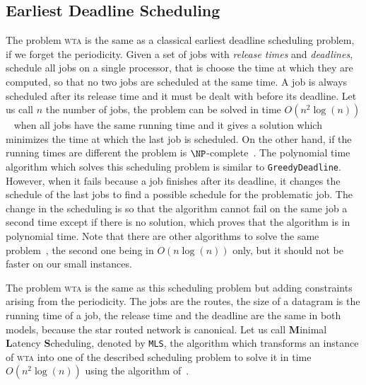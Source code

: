\documentclass[a4paper,10pt]{journal}
\newcommand\greedydeadline{\texttt{GreedyDeadline}\xspace}
\newcommand\MLS{\texttt{MLS}\xspace}
\newcommand\wta{\textsc{wta}\xspace}
\begin{document}
     \subsection{Earliest Deadline Scheduling}\label{sec:wtaheuristic}
     
     
     The problem \wta is the same as a classical earliest deadline scheduling problem, if we forget the periodicity. Given a set of jobs with \emph{release times} and \emph{deadlines}, schedule all jobs on a single processor, that is choose the time at which they are computed, so that no two jobs are scheduled at the same time. A job is always scheduled after its release time and it must be dealt with before its deadline. Let us call $n$ the number of jobs, the problem can be solved in time $O(n^2\log(n))$~\cite{simons1978fast} when all jobs have the same running time and it gives a solution which minimizes the time at which the last job is scheduled. On the other hand, if the running times are different the problem is $\NP$-complete~\cite{lenstra1977complexity}. 
     The polynomial time algorithm which solves this scheduling problem is similar to \greedydeadline. However, when it fails because a job finishes after its deadline, it changes the schedule of the last jobs to find a possible schedule for the problematic job. The change in the scheduling is so that the algorithm cannot fail on the same job a second time except if there is no solution, which proves that the algorithm is in polynomial time. Note that there are other algorithms to solve the same problem~\cite{carlier1979probleme,garey1981scheduling}, the second one being in $O(n\log(n))$ only, but it should not be faster on our small instances. 
     
     The problem \wta is the same as this scheduling problem but adding constraints arising from
     the periodicity. The jobs are the routes, the size of a datagram is the running time of a job, 
     the release time and the deadline are the same in both models, because the star routed network is canonical.
	 Let us call \textbf{M}inimal \textbf{L}atency \textbf{S}cheduling, denoted by \MLS, the algorithm which transforms an instance of \wta into one of the described scheduling problem to solve it in time $O(n^2\log(n))$ using the algorithm of~\cite{simons1978fast}.
     
\end{document}
